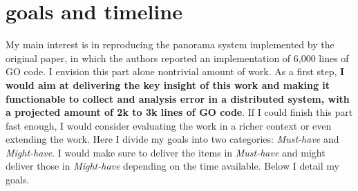 \section{goals and timeline}
My main interest is in reproducing the panorama system implemented by the original paper, in which the authors reported an implementation of 6,000 lines of GO code. I envision this part alone nontrivial amount of work. As a first step, \textbf{I would aim at delivering the key insight of this work and making it functionable to collect and analysis error in a distributed system, with a projected amount of 2k to 3k lines of GO code}. If I could finish this part fast enough, I would consider evaluating the work in a richer context or even extending the work. Here I divide my goals into two categories: \textit{Must-have} and \textit{Might-have}. I would make sure to deliver the items in \textit{Must-have} and might deliver those in \textit{Might-have} depending on the time available. Below I detail my goals.
